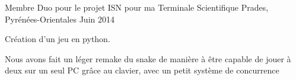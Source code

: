 


\begin{cventries}


\cventry
{Membre} %
{Duo pour le projet ISN pour ma Terminale Scientifique} %
{Prades, Pyrénées-Orientales}%
{Juin 2014} %
{ %
\begin{cvitems}
\item {Création d'un jeu en python.}
\item {Nous avons fait un léger remake du snake de manière à être capable de jouer à deux sur un seul PC grâce au clavier, avec un petit système de concurrence}
\end{cvitems}
}


\end{cventries}